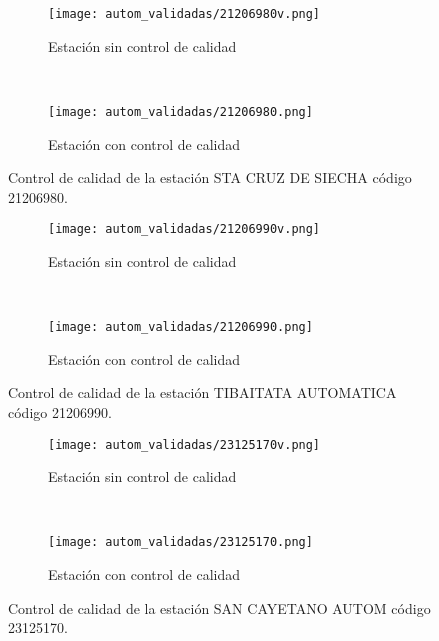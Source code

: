 \begin{figure}[H]
\begin{subfigure}[b]{0.5\textwidth}
\begin{center}
\texttt{[image: autom\_validadas/21206980v.png]}
\caption{Estación sin control de calidad}
        \end{center}
\end{subfigure}
~
\begin{subfigure}[b]{0.5\textwidth}
\begin{center}
\texttt{[image: autom\_validadas/21206980.png]}
\caption{Estación con control de calidad}
\end{center}    
\end{subfigure}
\caption{Control de calidad de la estación STA CRUZ DE SIECHA código 21206980.}
\end{figure}    
  
\begin{figure}[H]
\begin{subfigure}[b]{0.5\textwidth}
\begin{center}
\texttt{[image: autom\_validadas/21206990v.png]}
\caption{Estación sin control de calidad}
        \end{center}
\end{subfigure}
~
\begin{subfigure}[b]{0.5\textwidth}
\begin{center}
\texttt{[image: autom\_validadas/21206990.png]}
\caption{Estación con control de calidad}
\end{center}    
\end{subfigure}
\caption{Control de calidad de la estación TIBAITATA AUTOMATICA código 21206990.}
\end{figure}    
  
\begin{figure}[H]
\begin{subfigure}[b]{0.5\textwidth}
\begin{center}
\texttt{[image: autom\_validadas/23125170v.png]}
\caption{Estación sin control de calidad}
        \end{center}
\end{subfigure}
~
\begin{subfigure}[b]{0.5\textwidth}
\begin{center}
\texttt{[image: autom\_validadas/23125170.png]}
\caption{Estación con control de calidad}
\end{center}    
\end{subfigure}
\caption{Control de calidad de la estación SAN CAYETANO AUTOM código 23125170.}
\end{figure}    
  
